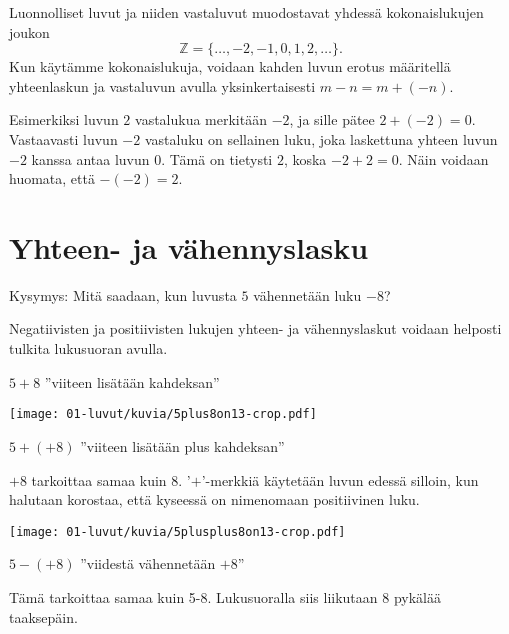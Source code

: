 Luonnolliset luvut ja niiden vastaluvut muodostavat yhdessä
kokonaislukujen joukon
\[\mathbb{Z} = \{\ldots, -2, -1, 0, 1, 2, \ldots\}.\]
Kun käytämme kokonaislukuja, voidaan kahden luvun erotus määritellä
yhteenlaskun ja vastaluvun avulla yksinkertaisesti $m-n = m+(-n)$.

    Esimerkiksi luvun $2$ vastalukua merkitään $-2$, ja sille pätee $2+(-2)=0$. Vastaavasti luvun $-2$ vastaluku on sellainen luku, joka laskettuna yhteen luvun $-2$ kanssa antaa luvun $0$. Tämä on tietysti $2$, koska $-2+2=0$. Näin voidaan huomata, että $-(-2)=2$.
    

\section{Yhteen- ja vähennyslasku}

    Kysymys: Mitä saadaan, kun luvusta $5$ vähennetään luku $-8$?
    
    Negatiivisten ja positiivisten lukujen yhteen- ja vähennyslaskut voidaan helposti tulkita lukusuoran avulla.
    
    
    $5+8$ ''viiteen lisätään kahdeksan''
    \begin{center}
    \texttt{[image: 01-luvut/kuvia/5plus8on13-crop.pdf]}
    \end{center}
    
    $5+(+8)$ ''viiteen lisätään plus kahdeksan''
    
    $+8$ tarkoittaa samaa kuin $8$. '$+$'-merkkiä käytetään luvun edessä silloin, kun halutaan korostaa, että kyseessä on nimenomaan positiivinen luku.
    
\vspace{0.3cm}     
    
    \begin{center}
    \texttt{[image: 01-luvut/kuvia/5plusplus8on13-crop.pdf]}
    \end{center}
    
    $5-(+8)$ ''viidestä vähennetään $+8$''
    
    Tämä tarkoittaa samaa kuin 5-8. Lukusuoralla siis liikutaan 8 pykälää taaksepäin.

